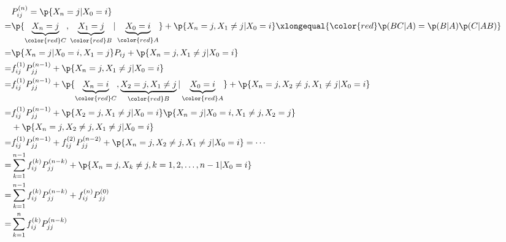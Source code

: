 \begin{solution}[2(郑老师解法)]
	\[\begin{aligned}
			  & P_{ij}^{(n)}=\p\{X_n=j|X_0=i\}                                                                                                                                                             \\
			= & \p\{\underbrace{X_n=j}_{\color{red}C},\underbrace{X_1=j}_{\color{red}B}|\underbrace{X_0=i}_{\color{red}A}\} + \p\{X_n=j,X_1\neq j|X_0=i\}\xlongequal{\color{red}\p(BC|A)=\p(B|A)\p(C|AB)}  \\
			= & \p\{X_n=j|X_0=i,X_1=j\}P_{ij} + \p\{X_n=j,X_1\neq j|X_0=i\}                                                                                                                                \\
			= & f_{ij}^{(1)}P_{jj}^{(n-1)} + \p\{X_n=j,X_1\neq j|X_0=i\}                                                                                                                                   \\
			= & f_{ij}^{(1)}P_{jj}^{(n-1)} + \p\{\underbrace{X_n=i}_{\color{red}C},\underbrace{X_2=j,X_1\neq j}_{\color{red}B}|\underbrace{X_0=i}_{\color{red}A}\} + \p\{X_n=j,X_2\neq j,X_1\neq j|X_0=i\} \\
			= & f_{ij}^{(1)}P_{jj}^{(n-1)} + \p\{X_2=j,X_1\neq j|X_0=i\}\p\{X_n=j|X_0=i,X_1\neq j,X_2=j\}                                                                                                  \\
			  & +\p\{X_n=j,X_2\neq j,X_1\neq j|X_0=i\}                                                                                                                                                     \\
			= & f_{ij}^{(1)}P_{jj}^{(n-1)} + f_{ij}^{(2)}P_{jj}^{(n-2)} + \p\{X_n=j,X_2\neq j,X_1\neq j|X_0=i\} = \cdots                                                                                   \\
			= & \sum_{k=1}^{n-1}f_{ij}^{(k)}P_{jj}^{(n-k)} + \p\{X_n=j,X_k\neq j,k=1,2,\dots , n-1|X_0=i\}                                                                                                 \\
			= & \sum_{k=1}^{n-1}f_{ij}^{(k)}P_{jj}^{(n-k)} + f_{ij}^{(n)}P_{jj}^{(0)}                                                                                                                      \\
			= & \sum_{k=1}^{n}f_{ij}^{(k)}P_{jj}^{(n-k)}
		\end{aligned}\]
\end{solution}

